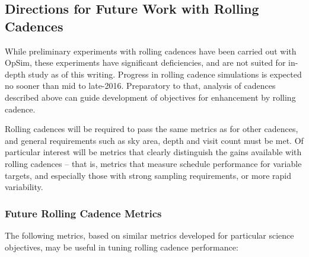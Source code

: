\subsection{Directions for Future Work with Rolling Cadences}
\label{sec:rolling:directions}

While preliminary experiments with rolling cadences have been carried
out with OpSim, these experiments have significant deficiencies, and are
not suited for in-depth study as of this writing.  Progress in rolling
cadence simulations is expected no sooner than mid to late-2016.
Preparatory to that, analysis of cadences described above can guide
development of objectives for enhancement by rolling cadence.

Rolling cadences will be required to pass the same metrics as for other
cadences, and general requirements such as sky area, depth and visit
count must be met.  Of particular interest will be metrics that clearly
distinguish the gains available with rolling cadences -- that is,
metrics that measure schedule performance for variable targets, and
especially those with strong sampling requirements, or more rapid
variability.

\subsubsection{Future Rolling Cadence Metrics}

The following metrics, based on similar metrics developed for particular
science objectives, may be useful in tuning rolling cadence performance:

